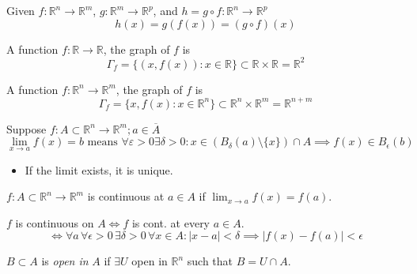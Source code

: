 \documentclass[a4paper]{article}
\numberwithin{equation}{section}
\newcommand{\R}{\mathbb{R}}
\begin{document}
\begin{definition}[Composition]
    Given $f:\R^n\to\R^m$, $g:\R^m\to\R^p$, and $h=g\circ f:\R^n\to\R^p$
    \begin{equation}
        h(x)=g(f(x))=(g\circ f)(x)
    \end{equation}
\end{definition}
\begin{definition}[Graph]
    A function $f:\R\to\R$, the graph of $f$ is 
    \begin{equation}
        \Gamma_f=\{(x,f(x)):x\in\R\}\subset\R\times\R=\R^2
    \end{equation}

    A function $f:\R^n\to\R^m$, the graph of $f$ is 
    \begin{equation}
        \Gamma_f=\{x,f(x):x\in\R^n\}\subset\R^n\times\R^m=\R^{n+m}
    \end{equation}
\end{definition}
\begin{definition}[Limit]
    Suppose $f:A\subset\R^n\to\R^m;a\in\overline A$
    \begin{equation}
        \lim_{x\to a}f(x)=b \text{ means } \forall\varepsilon>0\exists\delta>0:x\in (B_\delta(a)\setminus\{x\})\cap A\implies f(x)\in B_\epsilon(b)
    \end{equation}

    \begin{itemize}
        \item If the limit exists, it is unique.
    \end{itemize}
\end{definition}
\begin{definition}[Continuity]
    $f:A\subset\R^n\to\R^m$ is continuous at $a\in A$ if $\lim_{x\to a}f(x)=f(a)$.

    $f$ is continuous on $A\iff f$ is cont. at every $a\in A$.
    \begin{equation}
        \iff\forall a\,\forall\epsilon>0\,\exists\delta>0\,\forall x\in A:|x-a|<\delta\implies|f(x)-f(a)|<\epsilon
    \end{equation}
\end{definition}
\begin{definition}
    $B\subset A$ is \textit{open in }$A$ if $\exists U$ open in $\R^n$ such that $B=U\cap A$.
\end{definition}
\end{document}
